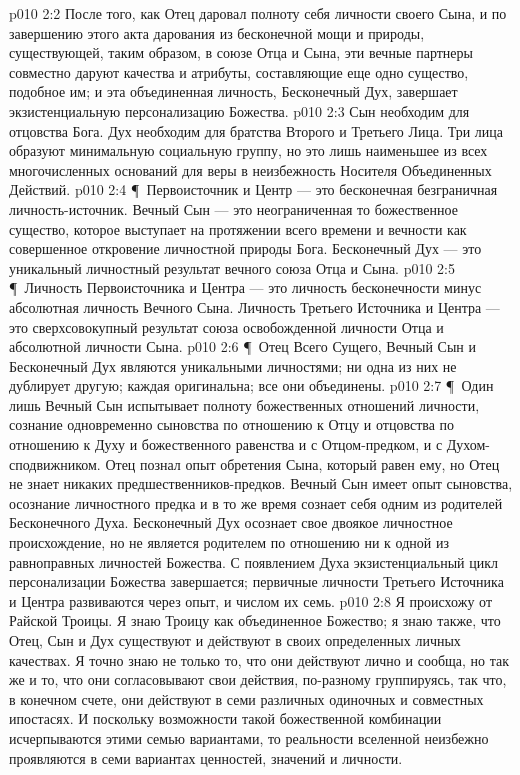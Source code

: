 \vs p010 2:2 После того, как Отец даровал полноту себя личности своего Сына, и по завершению этого акта дарования из бесконечной мощи и природы, существующей, таким образом, в союзе Отца и Сына, эти вечные партнеры совместно даруют качества и атрибуты, составляющие еще одно существо, подобное им; и эта объединенная личность, Бесконечный Дух, завершает экзистенциальную персонализацию Божества.
\vs p010 2:3 Сын необходим для отцовства Бога. Дух необходим для братства Второго и Третьего Лица. Три лица образуют минимальную социальную группу, но это лишь наименьшее из всех многочисленных оснований для веры в неизбежность Носителя Объединенных Действий.
\vs p010 2:4 \P\ Первоисточник и Центр --- это бесконечная  безграничная личность\hyp{}источник. Вечный Сын --- это неограниченная  то божественное существо, которое выступает на протяжении всего времени и вечности как совершенное откровение личностной природы Бога. Бесконечный Дух --- это  уникальный личностный результат вечного союза Отца и Сына.
\vs p010 2:5 \P\ Личность Первоисточника и Центра --- это личность бесконечности минус абсолютная личность Вечного Сына. Личность Третьего Источника и Центра --- это сверхсовокупный результат союза освобожденной личности Отца и абсолютной личности Сына.
\vs p010 2:6 \P\ Отец Всего Сущего, Вечный Сын и Бесконечный Дух являются уникальными личностями; ни одна из них не дублирует другую; каждая оригинальна; все они объединены.
\vs p010 2:7 \P\ Один лишь Вечный Сын испытывает полноту божественных отношений личности, сознание одновременно сыновства по отношению к Отцу и отцовства по отношению к Духу и божественного равенства и с Отцом\hyp{}предком, и с Духом\hyp{}сподвижником. Отец познал опыт обретения Сына, который равен ему, но Отец не знает никаких предшественников\hyp{}предков. Вечный Сын имеет опыт сыновства, осознание личностного предка и в то же время сознает себя одним из родителей Бесконечного Духа. Бесконечный Дух осознает свое двоякое личностное происхождение, но не является родителем по отношению ни к одной из равноправных личностей Божества. С появлением Духа экзистенциальный цикл персонализации Божества завершается; первичные личности Третьего Источника и Центра развиваются через опыт, и числом их семь.
\vs p010 2:8 Я происхожу от Райской Троицы. Я знаю Троицу как объединенное Божество; я знаю также, что Отец, Сын и Дух существуют и действуют в своих определенных личных качествах. Я точно знаю не только то, что они действуют лично и сообща, но так же и то, что они согласовывают свои действия, по\hyp{}разному группируясь, так что, в конечном счете, они действуют в семи различных одиночных и совместных ипостасях. И поскольку возможности такой божественной комбинации исчерпываются этими семью вариантами, то реальности вселенной неизбежно проявляются в семи вариантах ценностей, значений и личности.
